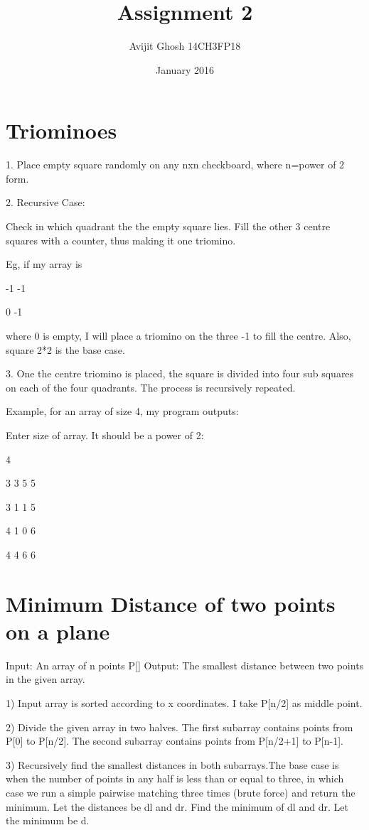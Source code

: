 \documentclass{article}
\title{Assignment 2}
\author{Avijit Ghosh 14CH3FP18 }
\date{January 2016}
\begin{document}
\maketitle

\section{Triominoes}

1. Place empty square randomly on any nxn checkboard, where n=power of 2 form.

2. Recursive Case:

Check in which quadrant the the empty square lies. Fill the other 3 centre squares with a counter, thus making it one triomino.

Eg, if my array is

-1  -1 
 
0    -1

where 0 is empty, I will place a triomino on the three -1 to fill the centre. Also, square 2*2 is the base case.

3. One the centre triomino is placed, the square is divided into four sub squares on each of the four quadrants. The process is recursively repeated. 

Example, for an array of size 4, my program outputs:

Enter size of array. It should be a power of 2: 

4


3  3  5  5

3  1  1  5

4  1  0  6

4  4  6  6 

\section{Minimum Distance of two points on a plane}

Input: An array of n points P[]
Output: The smallest distance between two points in the given array.

1) Input array is sorted according to x coordinates. I take P[n/2] as middle point.

2) Divide the given array in two halves. The first subarray contains points from P[0] to P[n/2]. The second subarray contains points from P[n/2+1] to P[n-1].

3) Recursively find the smallest distances in both subarrays.The base case is when the number of points in any half is less than or equal to three, in which case we run a simple pairwise matching three times (brute force) and return the minimum. Let the distances be dl and dr. Find the minimum of dl and dr. Let the minimum be d.
\end{document}

